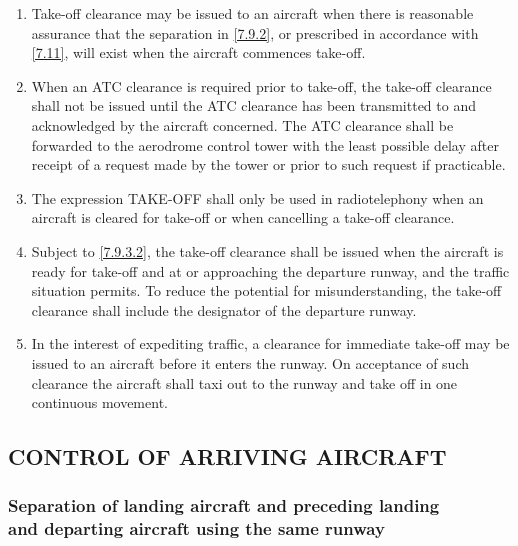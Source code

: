 \documentclass[../main.tex]{subfiles}
\begin{document}
    \begin{enumerate}
        \item Take-off clearance may be issued to an aircraft when there is reasonable assurance that the separation in \ref{7.9.2}, or prescribed in accordance with \ref{7.11}, will exist when the aircraft commences take-off.
        \item \label{7.9.3.2} When an ATC clearance is required prior to take-off, the take-off clearance shall not be issued until the ATC clearance has been transmitted to and acknowledged by the aircraft concerned. The ATC clearance shall be forwarded to the aerodrome control tower with the least possible delay after receipt of a request made by the tower or prior to such request if practicable.
        \item The expression TAKE-OFF shall only be used in radiotelephony when an aircraft is cleared for take-off or when cancelling a take-off clearance.


        \item Subject to \ref{7.9.3.2}, the take-off clearance shall be issued when the aircraft is ready for take-off and at or approaching the departure runway, and the traffic situation permits. To reduce the potential for misunderstanding, the take-off clearance shall include the designator of the departure runway.
        \item In the interest of expediting traffic, a clearance for immediate take-off may be issued to an aircraft before it enters the runway. On acceptance of such clearance the aircraft shall taxi out to the runway and take off in one continuous movement.
    \end{enumerate}

    \subsection[Control of arriving aircraft]{CONTROL OF ARRIVING AIRCRAFT}

    \subsubsection[Separation of landing aircraft and preceding landing and departing aircraft using the same runway]{Separation of landing aircraft and preceding landing \\ and departing aircraft using the same runway} \label{7.10.1}
\end{document}

